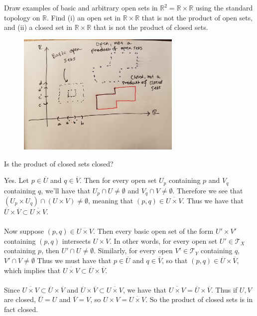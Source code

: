 \documentclass[a4paper,12pt,twoside]{hmcpset}
\begin{document}
\begin{exercise}[Exercise 4.33]
    Draw examples of basic and arbitrary open sets
in $\mathbb{R}^2 = \mathbb{R} \times \mathbb{R}$ using the standard
topology on $\mathbb{R}$. Find (i) an open set in $\mathbb{R} \times
\mathbb{R}$ that is not the product of open sets, and (ii) a closed
set in $\mathbb{R} \times \mathbb{R}$ that is not the product of
closed sets.
\end{exercise}

\begin{figure}[h!]
    \centering
    \includegraphics[width = 0.7\textwidth]{figures_theorems_sect_4/exercise_4_33.jpg}
\end{figure}

\begin{exercise}[Exercise 4.34]
    Is the product of closed sets closed?
\end{exercise}

\begin{solution}
    Yes.
Let $p \in \overline{U}$ and $q \in \overline{V}$. Then for every open set $U_p$ 
containing $p$ and $V_q$ containing $q$, we'll have that $U_p \cap U \ne \emptyset$
and $V_q \cap V \ne \emptyset$. Therefore we see that $(U_p \times U_q) \cap (U \times V)
\ne \emptyset$, meaning that $(p, q) \in \overline{U \times V}.$ Thus we have 
that $\overline{U} \times \overline{V} \subset \overline{U \times V}$.
\\
\\
Now suppose $(p, q) \in \overline{U \times V}$. Then every basic open
set of the form $U'\times V'$ containing $(p, q)$ intersects $U
\times V$. In other words, for every open set $U' \in
\mathscr{T}_X$ containing $p$, then $U' \cap U \ne \emptyset$. Similarly, for every
open $V' \in \mathscr{T}_Y$ containing $q$, $V' \cap V \ne \emptyset$
Thus we must have that $p \in \overline{U}$ and $q \in \overline{V}$, 
so that $(p, q) \in \overline{U} \times \overline{V}$, which implies
that $\overline{U \times V} \subset \overline{U} \times \overline{V}$.
\\
\\
Since $\overline{U \times V} \subset \overline{U} \times \overline{V}$
and $\overline{U} \times \overline{V} 
\subset \overline{U \times V}$, we have that $\overline{U \times V}
= \overline{U} \times \overline{V}$.  Thus if $U, V$ are closed,
$\overline{U} = U$ and $\overline{V} = V$, so $U \times V =
\overline{U \times V}.$ So the product of closed sets is in fact closed. 
\end{solution}
\end{document}
